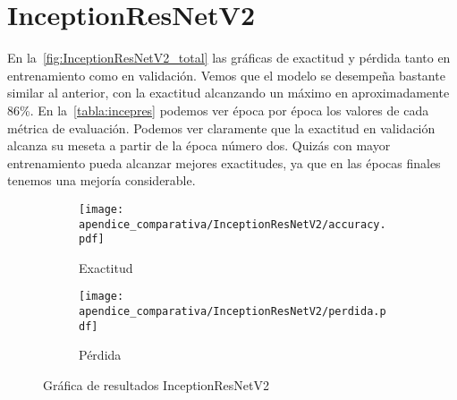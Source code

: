 \section{InceptionResNetV2}
En la~\autoref{fig:InceptionResNetV2_total} las gráficas de exactitud y pérdida
tanto en entrenamiento como en validación. Vemos que el modelo se desempeña
bastante similar al anterior, con la exactitud alcanzando un máximo en
aproximadamente 86\%. En la~\autoref{tabla:incepres} podemos ver época por época
los valores de cada métrica de evaluación. Podemos ver claramente que la
exactitud en validación alcanza su meseta a partir de la época número dos.
Quizás con mayor entrenamiento pueda alcanzar mejores exactitudes, ya que en las
épocas finales tenemos una mejoría considerable.
\begin{figure}[H]
    \centering
    \begin{subfigure}[b]{0.6\textwidth}
        \centering
       \texttt{[image: apendice\_comparativa/InceptionResNetV2/accuracy.pdf]}
       \caption{Exactitud}\label{fig:accuracy_incepres} 
    \end{subfigure}
    \begin{subfigure}[b]{0.6\textwidth}
        \centering
       \texttt{[image: apendice\_comparativa/InceptionResNetV2/perdida.pdf]}
       \caption{Pérdida}\label{fig:perdida_incepres}
    \end{subfigure}
    \caption{Gráfica de resultados InceptionResNetV2}\label{fig:InceptionResNetV2_total}
\end{figure}
